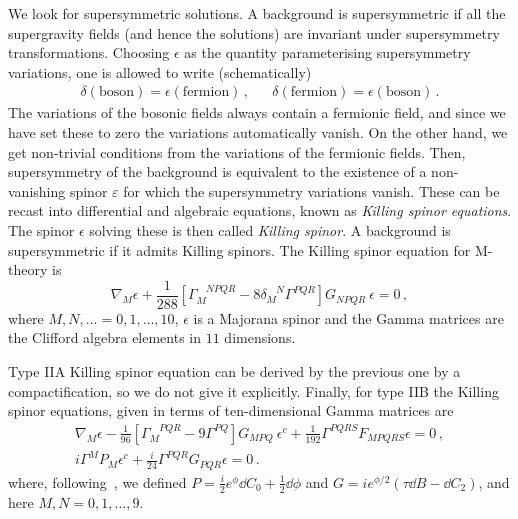 \documentclass[debug]{phd}
\begin{document}
				We look for supersymmetric solutions. 			
				A background is supersymmetric if all the supergravity fields (and hence the solutions) are invariant under supersymmetry transformations.
				Choosing $\epsilon$ as the quantity parameterising supersymmetry variations, one is allowed to write (schematically)
						\begin{align}\label{susyvar}
							& &	\delta(\text{boson}) = \epsilon (\text{fermion})\, ,	& &	\delta(\text{fermion}) = \epsilon (\text{boson})\, .	& &
						\end{align}
				The variations of the bosonic fields always contain a fermionic field, and since we have set these to zero the variations automatically vanish.
				On the other hand, we get non-trivial conditions from the variations of the fermionic fields. 
				Then, supersymmetry of the background is equivalent to the existence of a non-vanishing spinor $\varepsilon$ for which the supersymmetry variations vanish.
				These can be recast into differential and algebraic equations, known as \emph{Killing spinor equations}.
				The spinor $\epsilon$ solving these is then called \emph{Killing spinor}.
				A background is supersymmetric if it admits Killing spinors. The Killing spinor equation for M-theory is 
						\begin{equation}
							\nabla_M \epsilon + \frac{1}{288} \left[ \Gamma_M^{\phantom{M}NPQR} - 8 \delta_M^{\phantom{M}N} \Gamma^{PQR} \right] G_{NPQR}\ \epsilon =0 \, ,
						\end{equation}
				where $M,N, \ldots = 0,1, \dots, 10$, $\epsilon$ is a Majorana spinor and the Gamma matrices are the Clifford algebra elements in $11$ dimensions. 
				
				Type IIA Killing spinor equation can be derived by the previous one by a compactification, so we do not give it explicitly.
Finally, for type IIB the Killing spinor equations, given in terms of ten-dimensional Gamma matrices are
						\begin{subequations}
							\begin{align}
								\nabla_M \epsilon - \frac{1}{96} \left[ \Gamma_M^{\phantom{M}PQR} - 9 \Gamma^{PQ} \right] G_{MPQ}\ \epsilon^c + \frac{1}{192}\Gamma^{PQRS}F_{MPQRS} \epsilon =0 \, , \\
								i \Gamma^M P_M \epsilon^c + \frac{i}{24} \Gamma^{PQR} G_{PQR} \epsilon = 0 \, .
							\end{align}
						\end{subequations}
				where, following~\cite{Gauntlett:2005ww}, we defined $P = \tfrac{i}{2}e^\phi \dd C_0 + \tfrac{1}{2}\dd \phi$ and $G = i e^{\phi/2}(\tau \dd B - \dd C_2)$, and here $M,N = 0,1, \dots, 9$.
					
\end{document}
